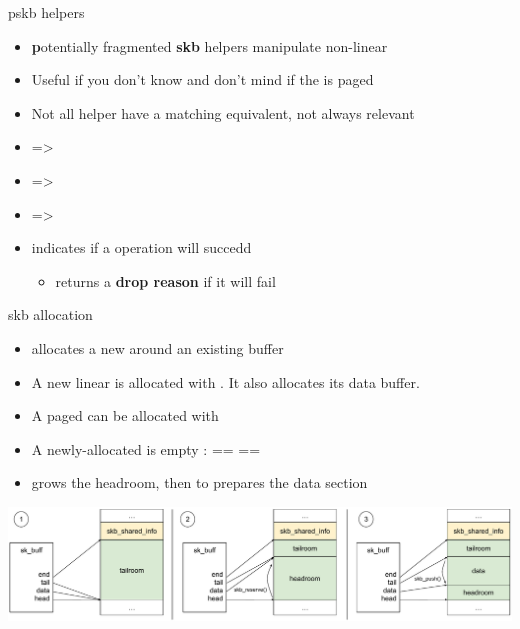 \begin{frame}{pskb helpers}
	\begin{itemize}
		\item \textbf{p}otentially fragmented \textbf{skb} helpers manipulate non-linear 
		\item Useful if you don't know and don't mind if the  is paged
		\item Not all helper have a matching  equivalent, not always relevant
		\item {} => 
		\item {} => 
		\item {} => 
		\item {} indicates if a  operation will succedd
			\begin{itemize}
				\item {} returns a \textbf{drop reason} if it will fail
			\end{itemize}
	\end{itemize}
\end{frame}

\begin{frame}{skb allocation}
	\begin{itemize}
		\item {} allocates a new  around an existing buffer
		\item A new linear  is allocated with . It also allocates its data buffer.
		\item A paged  can be allocated with 
		\item A newly-allocated  is empty :  ==  == 
		\item {} grows the headroom, then  to prepares the data section
	\end{itemize}
	\includegraphics[width=\textwidth]{slides/networking-skb/newskb.pdf}
\end{frame}


